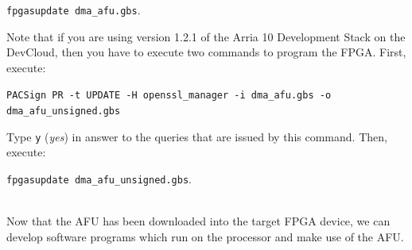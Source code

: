 \documentclass[epsfig,10pt,fullpage]{article}
\begin{document}
\begin{enumerate}
\noindent
\texttt{fpgasupdate dma\_afu.gbs}.

Note that if you are using version 1.2.1 of the Arria 10 Development Stack on the
DevCloud, then you have to execute two commands to program the FPGA. First, execute:

\noindent
\texttt{PACSign PR -t UPDATE -H openssl\_manager -i dma\_afu.gbs -o dma\_afu\_unsigned.gbs}

\noindent Type \texttt{y} ({\it yes}) in answer to the queries that are issued by this command. 
Then, execute:

\noindent
\texttt{fpgasupdate dma\_afu\_unsigned.gbs}.
\end{enumerate}
~\\
\noindent
Now that the AFU has been downloaded into the target FPGA device, we can develop software 
programs which run on the processor and make use of the AFU.
\end{document}

